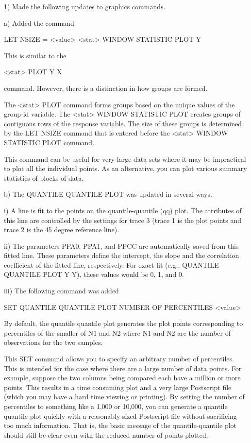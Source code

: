  1) Made the following updates to graphics commands.

    a) Added the command

          LET NSIZE = <value>
          <stat> WINDOW STATISTIC PLOT Y

       This is similar to the

          <stat> PLOT Y X

       command.  However, there is a distinction in how groups are
       formed.

       The <stat> PLOT command forms groups based on the unique values of
       the group-id variable.  The <stat> WINDOW STATISTIC PLOT creates
       groups of contiguous rows of the response variable.  The size of
       these groups is determined by the LET NSIZE command that is
       entered before the <stat> WINDOW STATISTIC PLOT command.

       This command can be useful for very large data sets where it may
       be impractical to plot all the individual points.  As an
       alternative, you can plot various summary statistics of blocks
       of data.

    b) The QUANTILE QUANTILE PLOT was updated in several ways.

          i) A line is fit to the points on the quantile-quantile (qq)
             plot.  The attributes of this line are controlled by the
             settings for trace 3 (trace 1 is the plot points and trace 2
             is the 45 degree reference line).

         ii) The parameters PPA0, PPA1, and PPCC are automatically saved
             from this fitted line.  These parameters define the intercept,
             the slope and the correlation coefficient of the fitted line,
             respectively.  For exact fit (e.g.,
             QUANTILE QUANTILE PLOT Y Y), these values would be 0, 1, and
             0.

        iii) The following command was added

                SET QUANTILE QUANTILE PLOT NUMBER OF PERCENTILES <value>

             By default, the quantile quantile plot generates the plot
             points corresponding to percentiles of the smaller of N1
             and N2 where N1 and N2 are the number of observations for
             the two samples.

             This SET command allows you to specify an arbitrary number
             of percentiles.  This is intended for the case where there
             are a large number of data points.  For example, suppose
             the two columns being compared each have a million or more
             points.  This results in a time consuming plot and a very
             large Postscript file (which you may have a hard time
             viewing or printing).  By setting the number of percentiles
             to something like a 1,000 or 10,000, you can generate a
             quantile quantile plot quickly with a reasonably sized
             Postscript file without sacrificing too much information.
             That is, the basic message of the quantile-quantile plot
             should still be clear even with the reduced number of
             points plotted.

